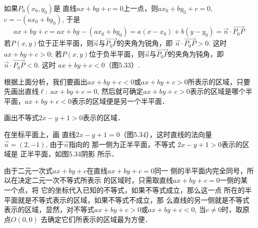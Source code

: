 如果$P_0(x_0,y_0)$是
直线$ax+by+c=0$上一点，则$ax_0+by_0+c=0$, $c=-(ax_0+by_0)$, 于是
\[ax+by+c=ax+by-(ax_0+by_0)=a(x-x_0)+b(y-y_0)=\vec{n}\cdot \Vec{P_0P}\]
若$P(x,y)$位于正半平面，则$\vec{n}$与$\Vec{P_0P}$的夹角为锐角，即
$\vec{n}\cdot \Vec{P_0P}>0$. 这时$ax+by+c>0$; 若$P(x,y)$位于负半平面，则$\vec{n}$与$\Vec{P_0P}$的夹角为钝角，即$\vec{n}\cdot \Vec{P_0P}<0$. 这时
$ax+by+c<0$（图5.33）.

根据上面分析，我们要画出$ax+by+c<0$或$ax+by
+c> 0$所表示的区域，只要先画出直线$\ell:\; ax+by+c=0$, 
然后就可确定$ax+by+c>0$表示的区域是哪个半平面，$ax
+by+c<0$表示的区域便是另一个半平面．

\begin{example}
    画出不等式$2x-y+1>0$表示的区域．
\end{example}

\begin{solution}
在坐标平面上，画
直线$2x-y+1=0$（图5.34），这时直线的法向量
$\vec{n}=(2,-1)$, 由于$\vec{n}$指向的
那一侧为正半平面，不等式
$2x-y+1>0$表示的区域是
正半平面，如图5.34阴影
所示．

由于二元一次式$ax+by+c$在直线$ax+by+c=0$同一
侧的半平面内完全同号，所以在决定二元一次不等式所表示
的区域时，只需取直线$ax+by+c=0$一侧的某一个点，将
它的坐标代入已知的不等式，如果不等式成立，那么这一点
所在的半平面就是不等式表示的区域，如果不等式不成立，那
么直线的另一侧就是不等式表示的区域，显然，对不等式$ax
+by+c>0$或$ax+by+c<0$, 当$c\ne 0$时，取原点$O(0,0)$
去确定它们所表示的区域最为方便．
\end{solution}


\begin{figure}[htp]\centering
    \begin{minipage}[t]{0.38\textwidth}
    \centering
    \caption{}
    \end{minipage}
    \begin{minipage}[t]{0.58\textwidth}
    \centering
    \caption{}
    \end{minipage}
    \end{figure}
  

